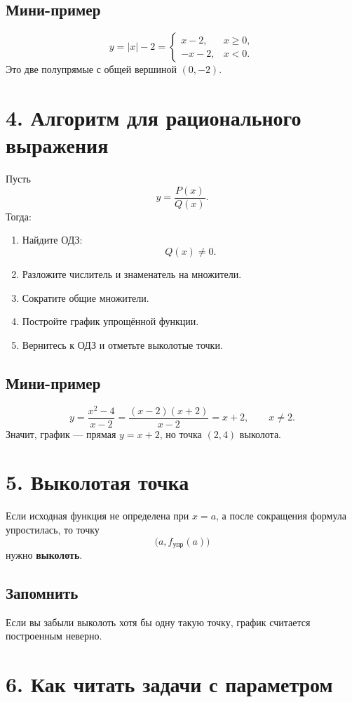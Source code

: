 \documentclass[a4paper,12pt]{article}
\begin{document}
\subsection*{Мини-пример}
\[
y=|x|-2=
\begin{cases}
x-2, & x\ge 0,\\
-x-2, & x<0.
\end{cases}
\]
Это две полупрямые с общей вершиной \((0,-2)\).

\section*{\textcolor{darkaccent}{4. Алгоритм для рационального выражения}}
Пусть
\[
y=\frac{P(x)}{Q(x)}.
\]
Тогда:

\begin{enumerate}
	\item Найдите ОДЗ:
	\[
	Q(x)\ne 0.
	\]
	\item Разложите числитель и знаменатель на множители.
	\item Сократите общие множители.
	\item Постройте график упрощённой функции.
	\item Вернитесь к ОДЗ и отметьте выколотые точки.
\end{enumerate}

\subsection*{Мини-пример}
\[
y=\frac{x^2-4}{x-2}=\frac{(x-2)(x+2)}{x-2}=x+2,\qquad x\ne 2.
\]
Значит, график --- прямая \(y=x+2\), но точка \((2,4)\) выколота.

\section*{\textcolor{darkaccent}{5. Выколотая точка}}
Если исходная функция не определена при \(x=a\), а после сокращения формула упростилась, то точку
\[
\bigl(a,f_{\text{упр}}(a)\bigr)
\]
нужно \textbf{выколоть}.

\subsection*{Запомнить}
Если вы забыли выколоть хотя бы одну такую точку, график считается построенным неверно.

\section*{\textcolor{darkaccent}{6. Как читать задачи с параметром}}
\end{document}
